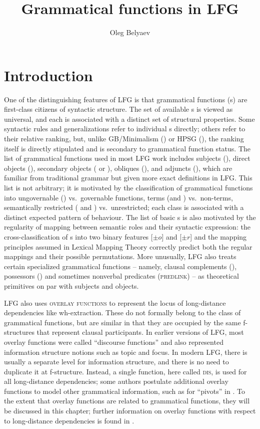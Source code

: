 \documentclass[output=paper]{../langscibook}
\title{Grammatical functions in LFG}
\author{Oleg Belyaev\affiliation{Lomonosov Moscow State University, Institute of Linguistics of the Russian Academy of Sciences, and Pushkin State Russian Language Institute}}
\begin{document}
\maketitle
\label{chap:GFs}

 \section{Introduction}

One of the distinguishing features of LFG is that grammatical functions ({\GF}s) are first-class citizens of syntactic structure. The set of available {\GF}s is viewed as universal, and each \GF is associated with a distinct set of structural properties. Some syntactic rules and generalizations refer to individual {\GF}s directly; others refer to their relative ranking, but, unlike GB/Minimalism () or HPSG (), the ranking itself is directly stipulated and is secondary to grammatical function status. The list of grammatical functions used in most LFG work includes subjects (\SUBJ), direct objects (\OBJ), secondary objects ({\OBJTHETA} or {}), obliques ({\OBLTHETA}), and adjuncts (\ADJ), which are familiar from traditional grammar but given more exact definitions in LFG. This list is not arbitrary; it is motivated by the classification of grammatical functions into ungovernable (\ADJ) vs.\ governable functions, terms (\SUBJ and \OBJ) vs.\ non-terms, semantically restricted ({\OBJTHETA} and {\OBLTHETA}) vs.\ unrestricted; each class is associated with a distinct expected pattern of behaviour. The list of basic {\GF}s is also motivated by the regularity of mapping between semantic roles and their syntactic expression: the cross-classification of {\GF}s into two binary features [$\pm{o}$] and [$\pm{r}$] and the mapping principles assumed in Lexical Mapping Theory \citep{bresnan1989locative} correctly predict both the regular mappings and their possible permutations. More unusually, LFG also treats certain specialized grammatical functions -- namely, clausal complements (\COMP), possessors (\POSS) and sometimes nonverbal predicates (\textsc{predlink}) -- as theoretical primitives on par with subjects and objects.
 
 LFG also uses \textsc{overlay functions} to represent the locus of long-distance dependencies like wh-extraction. These do not formally belong to the class of grammatical functions, but are similar in that they are occupied by the same f-structures that represent clausal participants. In earlier versions of LFG, most overlay functions were called ``discourse functions'' and also represented information structure notions such as topic and focus. In modern LFG, there is usually a separate level for information structure, and there is no need to duplicate it at f-structure. Instead, a single function, here called \textsc{dis}, is used for all long-distance dependencies; some authors postulate additional overlay functions to model other grammatical information, such as \PIVOT for ``pivots'' in \citet{falk06}. To the extent that overlay functions are related to grammatical functions, they will be discussed in this chapter; further information on overlay functions with respect to long-distance dependencies is found in .
 
\end{document}
